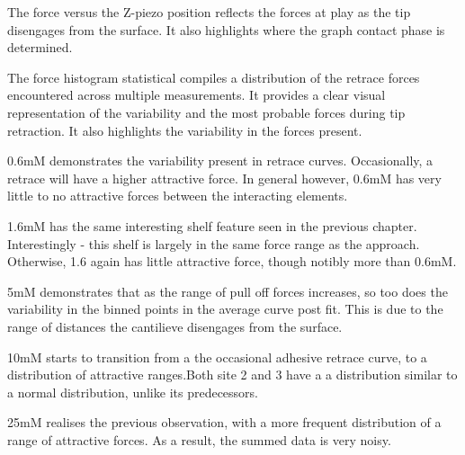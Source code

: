 The force versus the Z-piezo position reflects the forces at play as the tip disengages from the surface. It also highlights where the graph contact phase is determined.

The force histogram statistical compiles a distribution of the retrace forces encountered across multiple measurements. It provides a clear visual representation of the variability and the most probable forces during tip retraction. It also highlights the variability in the forces present.



0.6mM demonstrates the variability present in retrace curves. Occasionally, a retrace will have a higher attractive force. In general however, 0.6mM has very little to no attractive forces between the interacting elements.


1.6mM has the same interesting shelf feature seen in the previous chapter. Interestingly - this shelf is largely in the same force range as the approach. Otherwise, 1.6 again has little attractive force, though notibly more than 0.6mM.


5mM demonstrates that as the range of pull off forces increases, so too does the variability in the binned points in the average curve post fit. This is due to the range of distances the cantilieve disengages from the surface.


10mM starts to transition from a the occasional adhesive retrace curve, to a distribution of attractive ranges.Both site 2 and 3 have a a distribution similar to a normal distribution, unlike its predecessors.


25mM realises the previous observation, with a more frequent distribution of a range of attractive forces. As a result, the summed data is very noisy.


